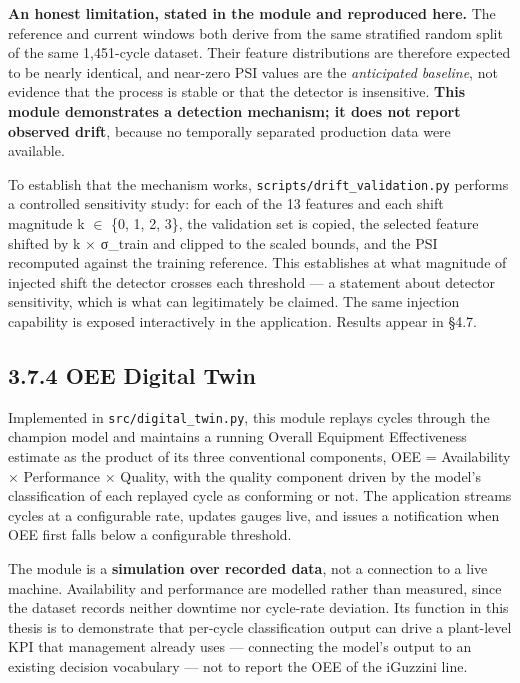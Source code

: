 \textbf{An honest limitation, stated in the module and reproduced here.} The reference and current windows both derive from the same stratified random split of the same 1,451-cycle dataset. Their feature distributions are therefore expected to be nearly identical, and near-zero PSI values are the \emph{anticipated baseline}, not evidence that the process is stable or that the detector is insensitive. \textbf{This module demonstrates a detection mechanism; it does not report observed drift}, because no temporally separated production data were available.

To establish that the mechanism works, \texttt{scripts/drift\_validation.py} performs a controlled sensitivity study: for each of the 13 features and each shift magnitude k $\in$ \{0, 1, 2, 3\}, the validation set is copied, the selected feature shifted by k × σ\_train and clipped to the scaled bounds, and the PSI recomputed against the training reference. This establishes at what magnitude of injected shift the detector crosses each threshold --- a statement about detector sensitivity, which is what can legitimately be claimed. The same injection capability is exposed interactively in the application. Results appear in §4.7.

\hypertarget{oee-digital-twin}{%
\subsection{3.7.4 OEE Digital Twin}\label{oee-digital-twin}}

Implemented in \texttt{src/digital\_twin.py}, this module replays cycles through the champion model and maintains a running Overall Equipment Effectiveness estimate as the product of its three conventional components, OEE = Availability × Performance × Quality, with the quality component driven by the model's classification of each replayed cycle as conforming or not. The application streams cycles at a configurable rate, updates gauges live, and issues a notification when OEE first falls below a configurable threshold.

The module is a \textbf{simulation over recorded data}, not a connection to a live machine. Availability and performance are modelled rather than measured, since the dataset records neither downtime nor cycle-rate deviation. Its function in this thesis is to demonstrate that per-cycle classification output can drive a plant-level KPI that management already uses --- connecting the model's output to an existing decision vocabulary --- not to report the OEE of the iGuzzini line.

